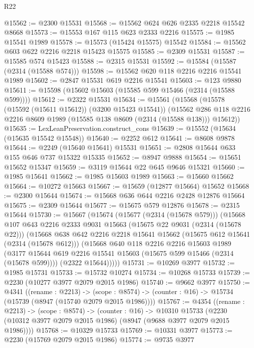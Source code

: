 \begin{lexlean}{R22}
\begin{coremodule}
@15562 := @2300 @15531
@15568 := @15562 @624 @626 @2335 @2218 @15542 @8668
@15573 := @15553 @167 @115 @623 @2333 @2216
@15575 := @1985 @15541 @1989
@15578 := @15573 (@15424 @15575) @15542
@15584 := @15562 @603 @622 @2216 @2218 @15423 @15575
@15585 := @2309 @15531
@15587 := @15585 @574 @15423
@15588 := @2315 @15531
@15592 := @15584 (@15587 (@2314 (@15588 @574)))
@15598 := @15562 @620 @118 @2216 @2216 @15541 @1989
@15602 := @2847 @15531 @619 @2216 @15541
@15603 := @123 @9880
@15611 := @15598 (@15602 @15603 (@15585 @599 @15466 (@2314 (@15588 @599))))
@15612 := @2322 @15531
@15634 := @15561
    (@15568
      (@15578 (@15592 (@15611 @15612)) (@3200 @15423 @15541))
      (@15562 @286 @118 @2216 @2216 @8609 @1989 (@15585 @138 @8609 (@2314 (@15588 @138))) @15612))
@15635 := LexLeanPreservation.construct_cons
@15639 := @15552 (@15634 (@15635 @15542 @15548))
@15640 := @2252 @612
@15641 := @8608 @9878
@15644 := @2249 (@15640 @15641) @15531
@15651 := @2808 @15644 @633 @155 @646 @737 @15322 @15335
@15652 := @8947 @9888
@15654 := @15651 @15652 @15347
@15659 := @3119 @15644 @22 @645 @9646 @15321
@15660 := @1985 @15641
@15662 := @1985 @15603 @1989
@15663 := @15660 @15662
@15664 := @10272 @15663
@15667 := @15659 (@12877 @15664) @15652
@15668 := @2300 @15644
@15674 := @15668 @636 @644 @2216 @2428 @12876 @15664
@15675 := @2309 @15644
@15677 := @15675 @579 @12876
@15678 := @2315 @15644
@15730 := @15667
    (@15674
      (@15677 (@2314 (@15678 @579)))
      (@15668
        @107
        @643
        @2216
        @2333
        @9031
        @15663
        (@15675 @22 @9031 (@2314 (@15678 @22)))
        (@15668
          @638
          @642
          @2216
          @2218
          @15641
          @15662
          (@15675 @612 @15641 (@2314 (@15678 @612)))
          (@15668
            @640
            @118
            @2216
            @2216
            @15603
            @1989
            (@3177 @15644 @619 @2216 @15541 @15603 (@15675 @599 @15466 (@2314 (@15678 @599))))
            (@2322 @15644)))))
@15731 := @10269 @3977
@15732 := @1985 @15731
@15733 := @15732 @10274
@15734 := @10268 @15733
@15739 := @2230 (@10277 @3977 @2079 @2015 @1986)
@15740 := @9662 @3977
@15750 := @4341
    ((rename : @2213) ->
    (scope : @8574) -> (counter : @16) -> @15734 (@15739 (@8947 (@15740 @2079 @2015 @1986))))
@15767 := @4354
    ((rename : @2213) ->
    (scope : @8574) ->
    (counter : @16) ->
    @10310 @15733 (@2230 (@10312 @3977 @2079 @2015 @1986) (@8947 (@9688 @3977 @2079 @2015 @1986))))
@15768 := @10329 @15733
@15769 := @10331 @3977
@15773 := @2230 (@15769 @2079 @2015 @1986)
@15774 := @9735 @3977

\end{coremodule}
\end{lexlean}
